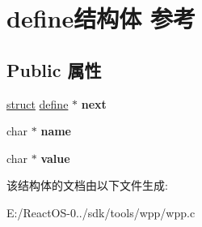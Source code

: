 \hypertarget{structdefine}{}\section{define结构体 参考}
\label{structdefine}
\subsection*{Public 属性}
\begin{DoxyCompactItemize}
\item 
\mbox{\label{structdefine_ab225aff3947a157d2dfa3321bebf008e}} 
\hyperlink{interfacestruct}{struct} \hyperlink{structdefine}{define} $\ast$ {\bfseries next}
\item 
\mbox{\label{structdefine_ae370a639795e7f074292f3e4b39108a8}} 
char $\ast$ {\bfseries name}
\item 
\mbox{\label{structdefine_adb090cf3f96cfcd9119528f27508ae7c}} 
char $\ast$ {\bfseries value}
\end{DoxyCompactItemize}


该结构体的文档由以下文件生成\+:\begin{DoxyCompactItemize}
\item 
E\+:/\+React\+O\+S-\/0../sdk/tools/wpp/wpp.\+c\end{DoxyCompactItemize}

